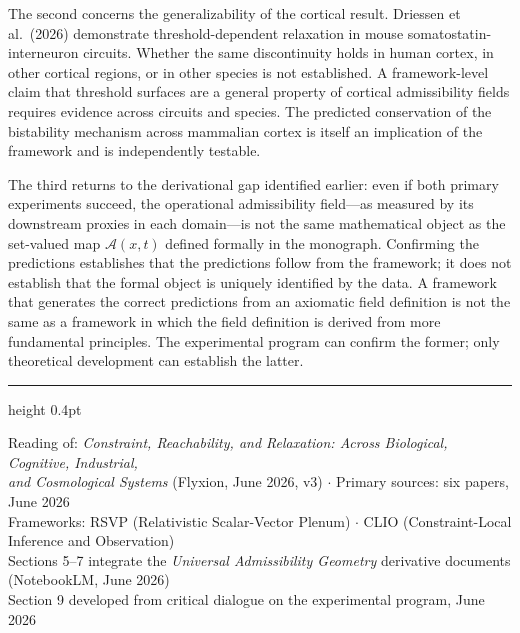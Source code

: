 \documentclass[12pt, a4paper]{article}
\theoremstyle{definition}
\begin{document}
The second concerns the generalizability of the cortical result. Driessen et al.\ (2026) demonstrate threshold-dependent relaxation in mouse somatostatin-interneuron circuits. Whether the same discontinuity holds in human cortex, in other cortical regions, or in other species is not established. A framework-level claim that threshold surfaces are a general property of cortical admissibility fields requires evidence across circuits and species. The predicted conservation of the bistability mechanism across mammalian cortex is itself an implication of the framework and is independently testable.

The third returns to the derivational gap identified earlier: even if both primary experiments succeed, the operational admissibility field---as measured by its downstream proxies in each domain---is not the same mathematical object as the set-valued map $\mathcal{A}(x,t)$ defined formally in the monograph. Confirming the predictions establishes that the predictions follow from the framework; it does not establish that the formal object is uniquely identified by the data. A framework that generates the correct predictions from an axiomatic field definition is not the same as a framework in which the field definition is derived from more fundamental principles. The experimental program can confirm the former; only theoretical development can establish the latter.

\vspace{2em}
{\color{rulingblue!40}\hrule height 0.4pt}
\vspace{1em}

\begin{center}
{\small\color{dimgray}
Reading of: \textit{Constraint, Reachability, and Relaxation: Across Biological, Cognitive, Industrial,}\\
\textit{and Cosmological Systems} (Flyxion, June 2026, v3) $\cdot$ Primary sources: six papers, June 2026\\
Frameworks: RSVP (Relativistic Scalar-Vector Plenum) $\cdot$ CLIO (Constraint-Local Inference and Observation)\\
Sections 5--7 integrate the \textit{Universal Admissibility Geometry} derivative documents (NotebookLM, June 2026)\\
Section 9 developed from critical dialogue on the experimental program, June 2026
}
\end{center}
\end{document}
